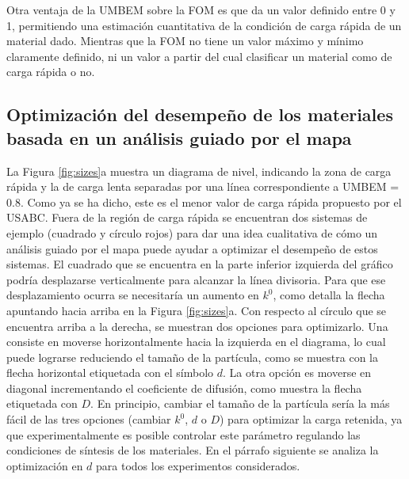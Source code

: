Otra ventaja de la UMBEM sobre la FOM es que da un valor definido entre 0 y 1,
permitiendo una estimación cuantitativa de la condición de carga rápida de un
material dado. Mientras que la FOM no tiene un valor máximo y mínimo claramente
definido, ni un valor a partir del cual clasificar un material como de carga 
rápida o no.

\subsection{Optimización del desempeño de los materiales basada en un análisis 
guiado por el mapa}

La Figura \ref{fig:sizes}a muestra un diagrama de nivel, indicando la zona de 
carga rápida y la de carga lenta separadas por una línea correspondiente a
UMBEM = 0.8. Como ya se ha dicho, este es el menor valor de carga rápida 
propuesto por el USABC. Fuera de la región de carga rápida se encuentran dos 
sistemas de ejemplo (cuadrado y círculo rojos) para dar una idea cualitativa de 
cómo un análisis guiado por el mapa puede ayudar a optimizar el desempeño de 
estos sistemas. El cuadrado que se encuentra en la parte inferior izquierda del gráfico 
podría desplazarse verticalmente para alcanzar la línea divisoria. Para que 
ese desplazamiento ocurra se necesitaría un aumento en $k^0$, como detalla la 
flecha apuntando hacia arriba en la Figura \ref{fig:sizes}a. Con respecto al 
círculo que se encuentra arriba a la derecha, se muestran dos opciones para
optimizarlo. Una consiste en moverse horizontalmente hacia la izquierda en el 
diagrama, lo cual puede lograrse reduciendo el tamaño de la partícula, como 
se muestra con la flecha horizontal etiquetada con el símbolo $d$. La otra opción
es moverse en diagonal incrementando el coeficiente de difusión, como 
muestra la flecha etiquetada con $D$. En principio, cambiar el tamaño de la 
partícula sería la más fácil de las tres opciones (cambiar $k^0$, $d$ o $D$) para 
optimizar la carga retenida, ya que experimentalmente es posible controlar este 
parámetro regulando las condiciones de síntesis de los materiales. En el párrafo
siguiente se analiza la optimización en $d$ para todos los experimentos 
considerados.
